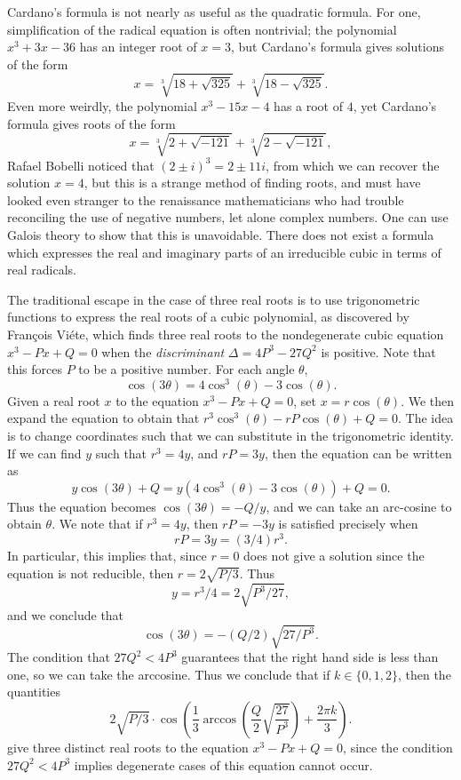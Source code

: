 Cardano's formula is not nearly as useful as the quadratic formula. For one, simplification of the radical equation is often nontrivial; the polynomial $x^3 + 3x - 36$ has an integer root of $x = 3$, but Cardano's formula gives solutions of the form
%
\[ x = \sqrt[3]{18 + \sqrt{325}} + \sqrt[3]{18 - \sqrt{325}}. \]
%
Even more weirdly, the polynomial $x^3 - 15x - 4$ has a root of $4$, yet Cardano's formula gives roots of the form
%
\[ x = \sqrt[3]{2 + \sqrt{-121}} + \sqrt[3]{2 - \sqrt{-121}}, \]
%
Rafael Bobelli noticed that $(2 \pm i)^3 = 2 \pm 11 i$, from which we can recover the solution $x = 4$, but this is a strange method of finding roots, and must have looked even stranger to the renaissance mathematicians who had trouble reconciling the use of negative numbers, let alone complex numbers. One can use Galois theory to show that this is unavoidable. There does not exist a formula which expresses the real and imaginary parts of an irreducible cubic in terms of real radicals.

The traditional escape in the case of three real roots is to use trigonometric functions to express the real roots of a cubic polynomial, as discovered by Fran\c{c}ois Vi\'{e}te, which finds three real roots to the nondegenerate cubic equation $x^3 - Px + Q = 0$ when the \emph{discriminant} $\Delta = 4P^3 - 27Q^2$ is positive. Note that this forces $P$ to be a positive number. For each angle $\theta$,
%
\[ \cos(3 \theta) = 4 \cos^3(\theta) - 3 \cos(\theta). \]
%
Given a real root $x$ to the equation $x^3 - Px + Q = 0$, set $x = r \cos(\theta)$. We then expand the equation to obtain that $r^3 \cos^3(\theta) - r P \cos(\theta) + Q = 0$. The idea is to change coordinates such that we can substitute in the trigonometric identity. If we can find $y$ such that $r^3 = 4y$, and $rP = 3y$, then the equation can be written as
%
\[ y \cos(3 \theta) + Q = y(4 \cos^3(\theta) - 3 \cos(\theta)) + Q = 0. \]
%
Thus the equation becomes $\cos(3\theta) = -Q/y$, and we can take an arc-cosine to obtain $\theta$. We note that if $r^3 = 4y$, then $rP = -3y$ is satisfied precisely when
%
\[ rP = 3y = (3/4)r^3. \]
%
In particular, this implies that, since $r = 0$ does not give a solution since the equation is not reducible, then $r = 2 \sqrt{P/3}$. Thus
%
\[ y = r^3/4 = 2 \sqrt{P^3/27}, \]
%
and we conclude that
%
\[ \cos(3\theta) = - (Q/2) \sqrt{27/P^3}. \]
%
The condition that $27 Q^2 < 4P^3$ guarantees that the right hand side is less than one, so we can take the arccosine. Thus we conclude that if $k \in \{ 0, 1 , 2 \}$, then the quantities
%
\[ 2 \sqrt{P/3} \cdot \cos \left( \frac{1}{3} \arccos \left( \frac{Q}{2} \sqrt{\frac{27}{P^3}} \right) + \frac{2 \pi k}{3} \right). \]
%
give three distinct real roots to the equation $x^3 - Px + Q = 0$, since the condition $27Q^2 < 4P^3$ implies degenerate cases of this equation cannot occur.

